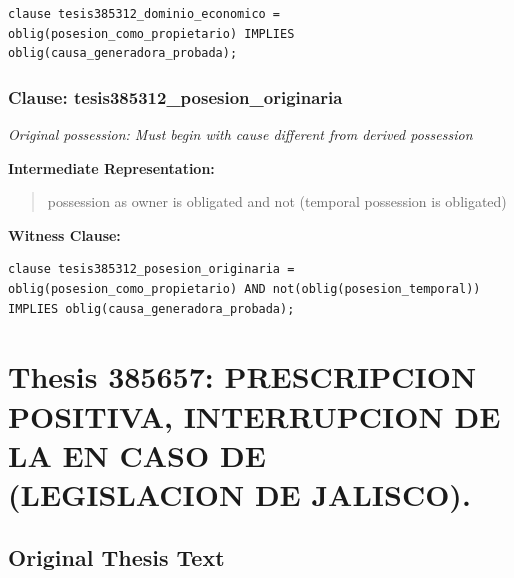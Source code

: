 \documentclass[11pt,a4paper]{article}
\begin{document}
\begin{lstlisting}[style=witnessstyle, language=Witness]
clause tesis385312_dominio_economico = oblig(posesion_como_propietario) IMPLIES oblig(causa_generadora_probada);
\end{lstlisting}

\subsubsection{Clause: tesis385312\_posesion\_originaria}

\textit{Original possession: Must begin with cause different from derived possession}

\textbf{Intermediate Representation:}

\begin{quote}
possession as owner is obligated and not (temporal possession is obligated)
\end{quote}

\textbf{Witness Clause:}

\begin{lstlisting}[style=witnessstyle, language=Witness]
clause tesis385312_posesion_originaria = oblig(posesion_como_propietario) AND not(oblig(posesion_temporal)) IMPLIES oblig(causa_generadora_probada);
\end{lstlisting}

\newpage

\section{Thesis 385657: PRESCRIPCION POSITIVA, INTERRUPCION DE LA EN CASO DE (LEGISLACION DE JALISCO).}
\label{thesis:385657}

\subsection{Original Thesis Text}
\end{document}
